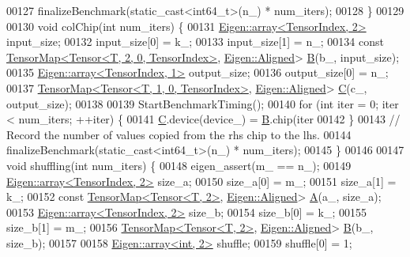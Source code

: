 \begin{DoxyCode}
00127     finalizeBenchmark(static\_cast<int64\_t>(n\_) * num\_iters);
00128   \}
00129 
00130   \textcolor{keywordtype}{void} colChip(\textcolor{keywordtype}{int} num\_iters) \{
00131     \hyperlink{class_eigen_1_1array}{Eigen::array<TensorIndex, 2>} input\_size;
00132     input\_size[0] = k\_;
00133     input\_size[1] = n\_;
00134     \textcolor{keyword}{const} \hyperlink{class_eigen_1_1_tensor_map}{TensorMap<Tensor<T, 2, 0, TensorIndex>}, 
      \hyperlink{group__enums_gga45fe06e29902b7a2773de05ba27b47a1ad37d4c71425bb286e9b4103830538fbf}{Eigen::Aligned}> \hyperlink{group___core___module_class_eigen_1_1_matrix}{B}(b\_, input\_size);
00135     \hyperlink{class_eigen_1_1array}{Eigen::array<TensorIndex, 1>} output\_size;
00136     output\_size[0] = n\_;
00137     \hyperlink{class_eigen_1_1_tensor_map}{TensorMap<Tensor<T, 1, 0, TensorIndex>}, 
      \hyperlink{group__enums_gga45fe06e29902b7a2773de05ba27b47a1ad37d4c71425bb286e9b4103830538fbf}{Eigen::Aligned}> \hyperlink{group___core___module}{C}(c\_, output\_size);
00138 
00139     StartBenchmarkTiming();
00140     \textcolor{keywordflow}{for} (\textcolor{keywordtype}{int} iter = 0; iter < num\_iters; ++iter) \{
00141       \hyperlink{group___core___module}{C}.device(device\_) = \hyperlink{group___core___module_class_eigen_1_1_matrix}{B}.chip(iter %
00142     \}
00143     \textcolor{comment}{// Record the number of values copied from the rhs chip to the lhs.}
00144     finalizeBenchmark(static\_cast<int64\_t>(n\_) * num\_iters);
00145   \}
00146 
00147   \textcolor{keywordtype}{void} shuffling(\textcolor{keywordtype}{int} num\_iters) \{
00148     eigen\_assert(m\_ == n\_);
00149     \hyperlink{class_eigen_1_1array}{Eigen::array<TensorIndex, 2>} size\_a;
00150     size\_a[0] = m\_;
00151     size\_a[1] = k\_;
00152     \textcolor{keyword}{const} \hyperlink{class_eigen_1_1_tensor_map}{TensorMap<Tensor<T, 2>}, \hyperlink{group__enums_gga45fe06e29902b7a2773de05ba27b47a1ad37d4c71425bb286e9b4103830538fbf}{Eigen::Aligned}> 
      \hyperlink{group___core___module_class_eigen_1_1_matrix}{A}(a\_, size\_a);
00153     \hyperlink{class_eigen_1_1array}{Eigen::array<TensorIndex, 2>} size\_b;
00154     size\_b[0] = k\_;
00155     size\_b[1] = m\_;
00156     \hyperlink{class_eigen_1_1_tensor_map}{TensorMap<Tensor<T, 2>}, \hyperlink{group__enums_gga45fe06e29902b7a2773de05ba27b47a1ad37d4c71425bb286e9b4103830538fbf}{Eigen::Aligned}> 
      \hyperlink{group___core___module_class_eigen_1_1_matrix}{B}(b\_, size\_b);
00157 
00158     \hyperlink{class_eigen_1_1array}{Eigen::array<int, 2>} shuffle;
00159     shuffle[0] = 1;

\end{DoxyCode}
